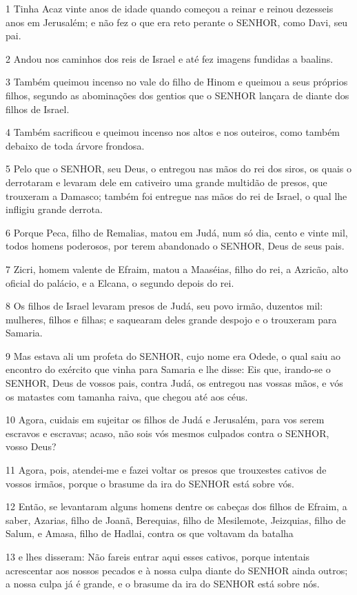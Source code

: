 \par 1 Tinha Acaz vinte anos de idade quando começou a reinar e reinou dezesseis anos em Jerusalém; e não fez o que era reto perante o SENHOR, como Davi, seu pai.
\par 2 Andou nos caminhos dos reis de Israel e até fez imagens fundidas a baalins.
\par 3 Também queimou incenso no vale do filho de Hinom e queimou a seus próprios filhos, segundo as abominações dos gentios que o SENHOR lançara de diante dos filhos de Israel.
\par 4 Também sacrificou e queimou incenso nos altos e nos outeiros, como também debaixo de toda árvore frondosa.
\par 5 Pelo que o SENHOR, seu Deus, o entregou nas mãos do rei dos siros, os quais o derrotaram e levaram dele em cativeiro uma grande multidão de presos, que trouxeram a Damasco; também foi entregue nas mãos do rei de Israel, o qual lhe infligiu grande derrota.
\par 6 Porque Peca, filho de Remalias, matou em Judá, num só dia, cento e vinte mil, todos homens poderosos, por terem abandonado o SENHOR, Deus de seus pais.
\par 7 Zicri, homem valente de Efraim, matou a Maaséias, filho do rei, a Azricão, alto oficial do palácio, e a Elcana, o segundo depois do rei.
\par 8 Os filhos de Israel levaram presos de Judá, seu povo irmão, duzentos mil: mulheres, filhos e filhas; e saquearam deles grande despojo e o trouxeram para Samaria.
\par 9 Mas estava ali um profeta do SENHOR, cujo nome era Odede, o qual saiu ao encontro do exército que vinha para Samaria e lhe disse: Eis que, irando-se o SENHOR, Deus de vossos pais, contra Judá, os entregou nas vossas mãos, e vós os matastes com tamanha raiva, que chegou até aos céus.
\par 10 Agora, cuidais em sujeitar os filhos de Judá e Jerusalém, para vos serem escravos e escravas; acaso, não sois vós mesmos culpados contra o SENHOR, vosso Deus?
\par 11 Agora, pois, atendei-me e fazei voltar os presos que trouxestes cativos de vossos irmãos, porque o brasume da ira do SENHOR está sobre vós.
\par 12 Então, se levantaram alguns homens dentre os cabeças dos filhos de Efraim, a saber, Azarias, filho de Joanã, Berequias, filho de Mesilemote, Jeizquias, filho de Salum, e Amasa, filho de Hadlai, contra os que voltavam da batalha
\par 13 e lhes disseram: Não fareis entrar aqui esses cativos, porque intentais acrescentar aos nossos pecados e à nossa culpa diante do SENHOR ainda outros; a nossa culpa já é grande, e o brasume da ira do SENHOR está sobre nós.
